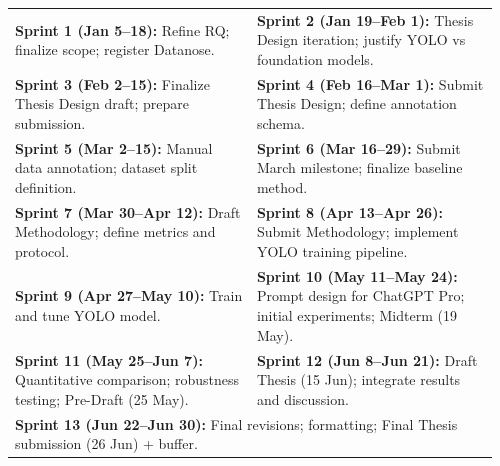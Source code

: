 \begin{center}
\small
\begin{tabular}{p{0.48\linewidth} p{0.48\linewidth}}

\textbf{Sprint 1 (Jan 5--18):} Refine RQ; finalize scope; register Datanose. &
\textbf{Sprint 2 (Jan 19--Feb 1):} Thesis Design iteration; justify YOLO vs foundation models. \\

\textbf{Sprint 3 (Feb 2--15):} Finalize Thesis Design draft; prepare submission. &
\textbf{Sprint 4 (Feb 16--Mar 1):} Submit Thesis Design; define annotation schema. \\

\textbf{Sprint 5 (Mar 2--15):} Manual data annotation; dataset split definition. &
\textbf{Sprint 6 (Mar 16--29):} Submit March milestone; finalize baseline method. \\

\textbf{Sprint 7 (Mar 30--Apr 12):} Draft Methodology; define metrics and protocol. &
\textbf{Sprint 8 (Apr 13--Apr 26):} Submit Methodology; implement YOLO training pipeline. \\

\textbf{Sprint 9 (Apr 27--May 10):} Train and tune YOLO model. &
\textbf{Sprint 10 (May 11--May 24):} Prompt design for ChatGPT Pro; initial experiments; Midterm (19 May). \\

\textbf{Sprint 11 (May 25--Jun 7):} Quantitative comparison; robustness testing; Pre-Draft (25 May). &
\textbf{Sprint 12 (Jun 8--Jun 21):} Draft Thesis (15 Jun); integrate results and discussion. \\

\multicolumn{2}{p{\linewidth}}{\textbf{Sprint 13 (Jun 22--Jun 30):} Final revisions; formatting; Final Thesis submission (26 Jun) + buffer.} \\

\end{tabular}
\end{center} 
